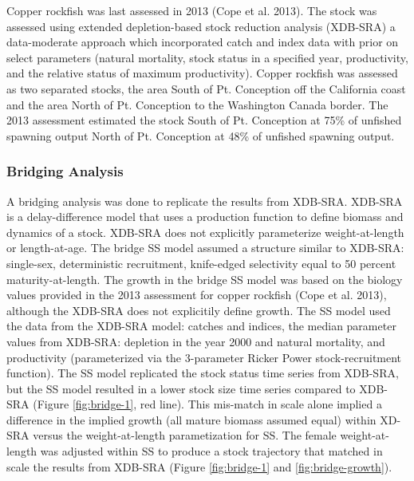 \documentclass[11pt,
  english,
  a4paper,
]{article}
\begin{document}
\leavevmode\tagmcend\tagstructend


Copper rockfish was last assessed in 2013 {(Cope et al. 2013)\leavevmode\tagmcend\tagstructend}. The stock was assessed using extended depletion-based stock reduction analysis (XDB-SRA) a data-moderate approach which incorporated catch and index data with prior on select parameters (natural mortality, stock status in a specified year, productivity, and the relative status of maximum productivity). Copper rockfish was assessed as two separated stocks, the area South of Pt. Conception off the California coast and the area North of Pt. Conception to the Washington Canada border. The 2013 assessment estimated the stock South of Pt. Conception at 75\% of unfished spawning output North of Pt. Conception at 48\% of unfished spawning output.

\leavevmode\tagmcend\tagstructend\par


\hypertarget{bridging-analysis}{%
\subsubsection{Bridging Analysis}\label{bridging-analysis}}

\leavevmode\tagmcend\tagstructend


A bridging analysis was done to replicate the results from XDB-SRA. XDB-SRA is a delay-difference model that uses a production function to define biomass and dynamics of a stock. XDB-SRA does not explicitly parameterize weight-at-length or length-at-age. The bridge SS model assumed a structure similar to XDB-SRA: single-sex, deterministic recruitment, knife-edged selectivity equal to 50 percent maturity-at-length. The growth in the bridge SS model was based on the biology values provided in the 2013 assessment for copper rockfish {(Cope et al. 2013)\leavevmode\tagmcend\tagstructend}, although the XDB-SRA does not explicitily define growth. The SS model used the data from the XDB-SRA model: catches and indices, the median parameter values from XDB-SRA: depletion in the year 2000 and natural mortality, and productivity (parameterized via the 3-parameter Ricker Power stock-recruitment function). The SS model replicated the stock status time series from XDB-SRA, but the SS model resulted in a lower stock size time series compared to XDB-SRA (Figure \ref{fig:bridge-1}, red line). This mis-match in scale alone implied a difference in the implied growth (all mature biomass assumed equal) within XD-SRA versus the weight-at-length parametization for SS. The female weight-at-length was adjusted within SS to produce a stock trajectory that matched in scale the results from XDB-SRA (Figure \ref{fig:bridge-1} and \ref{fig:bridge-growth}).
\end{document}
